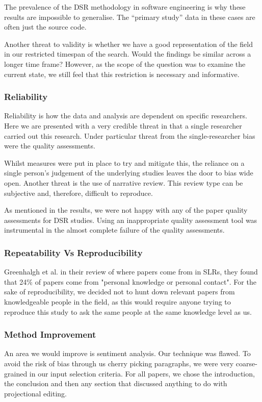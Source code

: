 The prevalence of the DSR methodology in software engineering is why these results are impossible to generalise.
The ``primary study'' data in these cases are often just the source code.

Another threat to validity is whether we have a good representation of the field in our restricted timespan of the search.
Would the findings be similar across a longer time frame?
However, as the scope of the question was to examine the current state, we still feel that this restriction is necessary and informative.

\subsubsection{Reliability}
Reliability is how the data and analysis are dependent on specific researchers.
Here we are presented with a very credible threat in that a single researcher carried out this research.
Under particular threat from the single-researcher bias were the quality assessments. 

Whilst measures were put in place to try and mitigate this, the reliance on a single person's judgement of the underlying studies leaves the door to bias wide open.
Another threat is the use of narrative review. 
This review type can be subjective and, therefore, difficult to reproduce.

As mentioned in the results, we were not happy with any of the paper quality assessments for DSR studies.
Using an inappropriate quality assessment tool was instrumental in the almost complete failure of the quality assessments.


\subsubsection{Repeatability Vs Reproducibility}
Greenhalgh et al.\cite{GreenhalghTrisha2005Eaeo} in their review of where papers come from in SLRs, they found that 24\% of papers come from "personal knowledge or personal contact".
For the sake of reproducibility, we decided not to hunt down relevant papers from knowledgeable people in the field, as this would require anyone trying to reproduce this study to ask the same people at the same knowledge level as us.

\subsubsection{Method Improvement}
An area we would improve is sentiment analysis.
Our technique was flawed.
To avoid the risk of bias through us cherry picking paragraphs, we were very coarse-grained in our input selection criteria.
For all papers, we chose the introduction, the conclusion and then any section that discussed anything to do with projectional editing.

